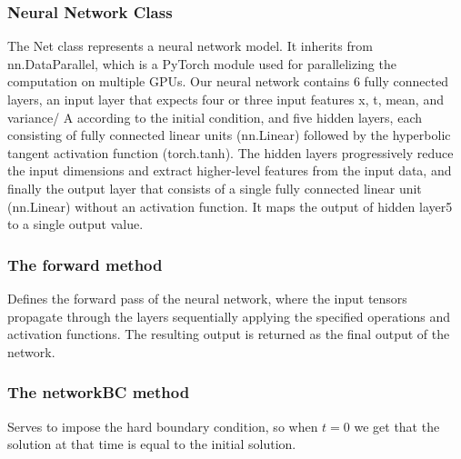 \documentclass{article}
\begin{document}


\subsubsection{Neural Network Class}

The Net class represents a neural network model. It inherits from nn.DataParallel, which is a PyTorch module used for parallelizing the computation on multiple GPUs.
Our neural network contains 6 fully connected layers, an input layer that expects four or three input features x, t, mean, and variance/ A according to the initial condition, and five hidden layers, each consisting of fully connected linear units (nn.Linear) followed by the hyperbolic tangent activation function (torch.tanh). The hidden layers progressively reduce the input dimensions and extract higher-level features from the input data, 
and finally the output layer that consists of a single fully connected linear unit (nn.Linear) without an activation function. It maps the output of hidden layer5 to a single output value.

\subsubsection*{The forward method} Defines the forward pass of the neural network, where the input tensors propagate through the layers sequentially applying the specified operations and activation functions. The resulting output is returned as the final output of the network.

\subsubsection*{The networkBC method} Serves to impose the hard boundary condition, so when $t=0$ we get that the solution at that time is equal to the initial solution. 
\end{document}

